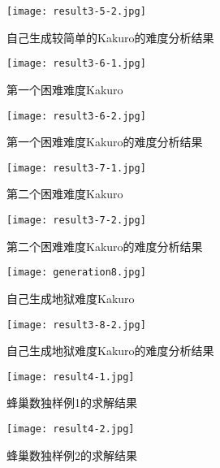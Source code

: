         \begin{figure}[htb]
            \centering
            \texttt{[image: result3-5-2.jpg]}
            \caption[结果3-5]{自己生成较简单的Kakuro的难度分析结果}
        \end{figure}
        \begin{figure}[htb]
            \centering
            \texttt{[image: result3-6-1.jpg]}
            \caption[数独3-6]{第一个困难难度Kakuro}
        \end{figure}
        \begin{figure}[htb]
            \centering
            \texttt{[image: result3-6-2.jpg]}
            \caption[结果3-6]{第一个困难难度Kakuro的难度分析结果}
        \end{figure}
        \begin{figure}[htb]
            \centering
            \texttt{[image: result3-7-1.jpg]}
            \caption[数独3-7]{第二个困难难度Kakuro}
        \end{figure}
        \begin{figure}[htb]
            \centering
            \texttt{[image: result3-7-2.jpg]}
            \caption[结果3-7]{第二个困难难度Kakuro的难度分析结果}
        \end{figure}
        \begin{figure}[htb]
            \centering
            \texttt{[image: generation8.jpg]}
            \caption[数独3-8]{自己生成地狱难度Kakuro}
        \end{figure}
        \begin{figure}[htb]
            \centering
            \texttt{[image: result3-8-2.jpg]}
            \caption[结果3-8]{自己生成地狱难度Kakuro的难度分析结果}
        \end{figure}
        \begin{figure}[htb]
            \centering
            \texttt{[image: result4-1.jpg]}
            \caption[结果4-1]{蜂巢数独样例1的求解结果}\label{resBee}
        \end{figure}
        \begin{figure}[htb]
            \centering
            \texttt{[image: result4-2.jpg]}
            \caption[结果4-2]{蜂巢数独样例2的求解结果}
        \end{figure}
